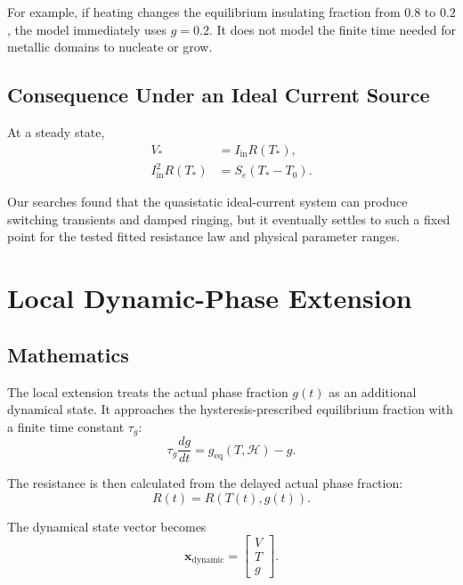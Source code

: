\documentclass[11pt]{article}
\begin{document}
For example, if heating changes the equilibrium insulating fraction from $0.8$ to $0.2$, the model immediately uses $g=0.2$. It does not model the finite time needed for metallic domains to nucleate or grow.

\subsection{Consequence Under an Ideal Current Source}

At a steady state,
\begin{align}
V_* &= I_{\mathrm{in}}R(T_*),\\
I_{\mathrm{in}}^2R(T_*) &= S_e(T_*-T_0).
\end{align}

Our searches found that the quasistatic ideal-current system can produce switching transients and damped ringing, but it eventually settles to such a fixed point for the tested fitted resistance law and physical parameter ranges.

\section{Local Dynamic-Phase Extension}

\subsection{Mathematics}

The local extension treats the actual phase fraction $g(t)$ as an additional dynamical state. It approaches the hysteresis-prescribed equilibrium fraction with a finite time constant $\tau_g$:
\begin{equation}
\tau_g\frac{dg}{dt}
=
g_{\mathrm{eq}}(T,\mathcal{H})-g.
\label{eq:dynamic_g}
\end{equation}

The resistance is then calculated from the delayed actual phase fraction:
\begin{equation}
R(t) = R\!\left(T(t),g(t)\right).
\end{equation}

The dynamical state vector becomes
\begin{equation}
\mathbf{x}_{\mathrm{dynamic}} =
\begin{bmatrix}
V \\ T \\ g
\end{bmatrix}.
\end{equation}
\end{document}
